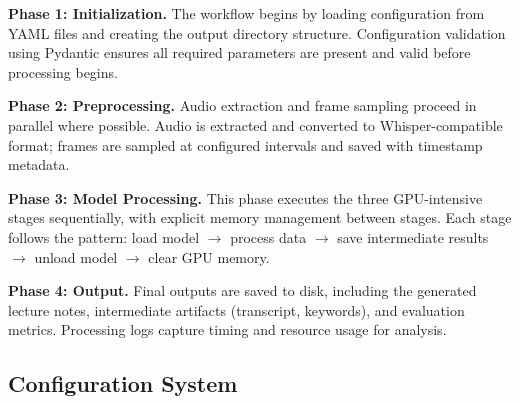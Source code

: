 %

\textbf{Phase 1: Initialization.} The workflow begins by loading configuration from YAML files and creating the output directory structure. Configuration validation using Pydantic ensures all required parameters are present and valid before processing begins.

\textbf{Phase 2: Preprocessing.} Audio extraction and frame sampling proceed in parallel where possible. Audio is extracted and converted to Whisper-compatible format; frames are sampled at configured intervals and saved with timestamp metadata.

\textbf{Phase 3: Model Processing.} This phase executes the three GPU-intensive stages sequentially, with explicit memory management between stages. Each stage follows the pattern: load model $\rightarrow$ process data $\rightarrow$ save intermediate results $\rightarrow$ unload model $\rightarrow$ clear GPU memory.

\textbf{Phase 4: Output.} Final outputs are saved to disk, including the generated lecture notes, intermediate artifacts (transcript, keywords), and evaluation metrics. Processing logs capture timing and resource usage for analysis.

\subsection{Configuration System}

